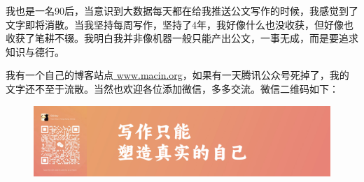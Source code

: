 \documentclass[12pt,a5paper]{ctexbook}
\begin{document}
我也是一名90后，当意识到大数据每天都在给我推送公文写作的时候，我感觉到了文字即将消散。当我坚持每周写作，坚持了4年，我好像什么也没收获，但好像也收获了笔耕不辍。我明白我并非像机器一般只能产出公文，一事无成，而是要追求知识与德行。

我有一个自己的博客站点\href{https://www.macin.org/}{ www.macin.org}，如果有一天腾讯公众号死掉了，我的文字还不至于流散。当然也欢迎各位添加微信，多多交流。微信二维码如下：

\begin{figure}[htbp] %
\centering %
\includegraphics[width=1\textwidth]{wechat.jpg} %
\end{figure}
\end{document}
